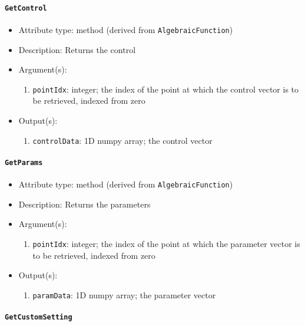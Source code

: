 \documentclass[]{article}
\begin{document}
\paragraph{\texttt{GetControl}}

\begin{itemize}
	\item Attribute type: method (derived from \texttt{AlgebraicFunction})
	\item Description: Returns the control
	\item Argument(s):
	\begin{enumerate}
		\item \texttt{pointIdx}: integer; the index of the point at which the control vector is to be retrieved, indexed from zero
	\end{enumerate}
	\item Output(s):
	\begin{enumerate}
		\item \texttt{controlData}: 1D numpy array; the control vector
	\end{enumerate}
\end{itemize}

\paragraph{\texttt{GetParams}}

\begin{itemize}
	\item Attribute type: method (derived from \texttt{AlgebraicFunction})
	\item Description: Returns the parameters
	\item Argument(s):
	\begin{enumerate}
		\item \texttt{pointIdx}: integer; the index of the point at which the parameter vector is to be retrieved, indexed from zero
	\end{enumerate}
	\item Output(s):
	\begin{enumerate}
		\item \texttt{paramData}: 1D numpy array; the parameter vector
	\end{enumerate}
\end{itemize}

\paragraph{\texttt{GetCustomSetting}}
\end{document}
